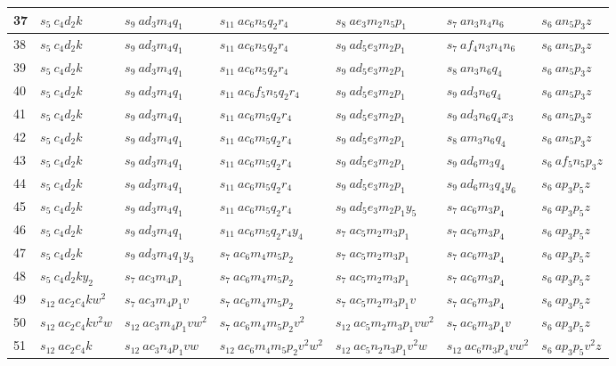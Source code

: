 \documentclass[preliminary,copyright,creativecommons]{eptcs}
\newcommand{\myway}[1]{\raisebox{-4pt}{\rule{0pt}{16pt}}\colorbox[rgb]{.7,.7,.7}{#1}}
\theoremstyle{remark}
\begin{document}
\begin{table}[h]
\begin{center}
\begin{tabular}{ | l | l | l | l | l | l | l | }
37 & $s_5~ c_4d_2k$ & $s_9~ ad_3m_4q_1$ & $s_{11}~ ac_6n_5q_2r_4$ & $s_8~ ae_3m_2n_5p_1$ & $s_7~ an_3n_4n_6$ & $s_6~ an_5p_3z$ \\ \hline
38 & $s_5~ c_4d_2k$ & $s_9~ ad_3m_4q_1$ & $s_{11}~ ac_6n_5q_2r_4$ & $s_9~ ad_5e_3m_2p_1$ & $s_7~ af_4n_3n_4n_6$ & $s_6~ an_5p_3z$ \\ \hline
39 & $s_5~ c_4d_2k$ & $s_9~ ad_3m_4q_1$ & $s_{11}~ ac_6n_5q_2r_4$ & $s_9~ ad_5e_3m_2p_1$ & $s_8~ an_3n_6q_4$ & $s_6~ an_5p_3z$ \\ \hline
40 & $s_5~ c_4d_2k$ & $s_9~ ad_3m_4q_1$ & $s_{11}~ ac_6f_5n_5q_2r_4$ & $s_9~ ad_5e_3m_2p_1$ & $s_9~ ad_3n_6q_4$ & $s_6~ an_5p_3z$ \\ \hline
41 & $s_5~ c_4d_2k$ & $s_9~ ad_3m_4q_1$ & $s_{11}~ ac_6m_5q_2r_4$ & $s_9~ ad_5e_3m_2p_1$ & $s_9~ ad_3n_6q_4x_3$ & $s_6~ an_5p_3z$ \\ \hline
42 & $s_5~ c_4d_2k$ & $s_9~ ad_3m_4q_1$ & $s_{11}~ ac_6m_5q_2r_4$ & $s_9~ ad_5e_3m_2p_1$ & $s_8~ am_3n_6q_4$ & $s_6~ an_5p_3z$ \\ \hline
43 & $s_5~ c_4d_2k$ & $s_9~ ad_3m_4q_1$ & $s_{11}~ ac_6m_5q_2r_4$ & $s_9~ ad_5e_3m_2p_1$ & $s_9~ ad_6m_3q_4$ & $s_6~ af_5n_5p_3z$ \\ \hline
44 & $s_5~ c_4d_2k$ & $s_9~ ad_3m_4q_1$ & $s_{11}~ ac_6m_5q_2r_4$ & $s_9~ ad_5e_3m_2p_1$ & $s_9~ ad_6m_3q_4y_6$ & \myway{$s_6~ ap_3p_5z$} \\ \hline
45 & $s_5~ c_4d_2k$ & $s_9~ ad_3m_4q_1$ & $s_{11}~ ac_6m_5q_2r_4$ & $s_9~ ad_5e_3m_2p_1y_5$ & \myway{$s_7~ ac_6m_3p_4$} & $s_6~ ap_3p_5z$ \\ \hline
46 & $s_5~ c_4d_2k$ & $s_9~ ad_3m_4q_1$ & $s_{11}~ ac_6m_5q_2r_4y_4$ & \myway{$s_7~ ac_5m_2m_3p_1$} & $s_7~ ac_6m_3p_4$ & $s_6~ ap_3p_5z$ \\ \hline
47 & $s_5~ c_4d_2k$ & $s_9~ ad_3m_4q_1y_3$ & \myway{$s_7~ ac_6m_4m_5p_2$} & $s_7~ ac_5m_2m_3p_1$ & $s_7~ ac_6m_3p_4$ & $s_6~ ap_3p_5z$ \\ \hline
48 & $s_5~ c_4d_2ky_2$ & \myway{$s_7~ ac_3m_4p_1$} & $s_7~ ac_6m_4m_5p_2$ & $s_7~ ac_5m_2m_3p_1$ & $s_7~ ac_6m_3p_4$ & $s_6~ ap_3p_5z$ \\ \hline
49 & \myway{$s_{12}~ ac_2c_4kw^{2}$} & $s_7~ ac_3m_4p_1v$ & $s_7~ ac_6m_4m_5p_2$ & $s_7~ ac_5m_2m_3p_1v$ & $s_7~ ac_6m_3p_4$ & $s_6~ ap_3p_5z$ \\ \hline
50 & $s_{12}~ ac_2c_4kv^{2}w$ & $s_{12}~ ac_3m_4p_1vw^{2}$ & $s_7~ ac_6m_4m_5p_2v^{2}$ & $s_{12}~ ac_5m_2m_3p_1vw^{2}$ & $s_7~ ac_6m_3p_4v$ & $s_6~ ap_3p_5z$ \\ \hline
51 & $s_{12}~ ac_2c_4k$ & $s_{12}~ ac_3n_4p_1vw$ & $s_{12}~ ac_6m_4m_5p_2v^{2}w^{2}$ & $s_{12}~ ac_5n_2n_3p_1v^{2}w$ & $s_{12}~ ac_6m_3p_4vw^{2}$ & $s_6~ ap_3p_5v^{2}z$ \\ \hline

\end{tabular}
\end{center}
\end{table}
\end{document}
